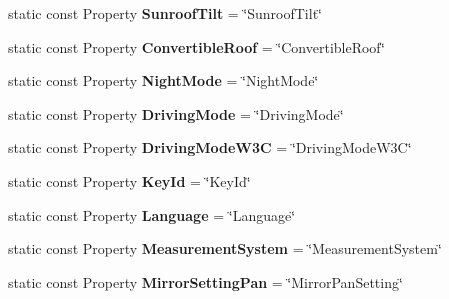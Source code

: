\begin{DoxyCompactItemize}
\item 
\hypertarget{classVehicleProperty_aaa5b7fe1aa9c1df58285370a2223a9a7}{static const Property {\bfseries Sunroof\-Tilt} = \char`\"{}Sunroof\-Tilt\char`\"{}}\label{classVehicleProperty_aaa5b7fe1aa9c1df58285370a2223a9a7}

\item 
\hypertarget{classVehicleProperty_ac81ed60b4ae5140288191380470aa6fe}{static const Property {\bfseries Convertible\-Roof} = \char`\"{}Convertible\-Roof\char`\"{}}\label{classVehicleProperty_ac81ed60b4ae5140288191380470aa6fe}

\item 
\hypertarget{classVehicleProperty_af85dc0e35b81d1ce30818c0dc2cbde94}{static const Property {\bfseries Night\-Mode} = \char`\"{}Night\-Mode\char`\"{}}\label{classVehicleProperty_af85dc0e35b81d1ce30818c0dc2cbde94}

\item 
\hypertarget{classVehicleProperty_a4b68af6a7539a07a2be7438bd6ced9f0}{static const Property {\bfseries Driving\-Mode} = \char`\"{}Driving\-Mode\char`\"{}}\label{classVehicleProperty_a4b68af6a7539a07a2be7438bd6ced9f0}

\item 
\hypertarget{classVehicleProperty_a54cf61b61a0d1929e729454c834d3cf2}{static const Property {\bfseries Driving\-Mode\-W3\-C} = \char`\"{}Driving\-Mode\-W3\-C\char`\"{}}\label{classVehicleProperty_a54cf61b61a0d1929e729454c834d3cf2}

\item 
\hypertarget{classVehicleProperty_ab4e37b9cd6be99aa50f009cf8b26f8ae}{static const Property {\bfseries Key\-Id} = \char`\"{}Key\-Id\char`\"{}}\label{classVehicleProperty_ab4e37b9cd6be99aa50f009cf8b26f8ae}

\item 
\hypertarget{classVehicleProperty_a715e47aac9daf8a45e34f8379f722c36}{static const Property {\bfseries Language} = \char`\"{}Language\char`\"{}}\label{classVehicleProperty_a715e47aac9daf8a45e34f8379f722c36}

\item 
\hypertarget{classVehicleProperty_a4f252ed33c21bfe8ffab942c765ccd40}{static const Property {\bfseries Measurement\-System} = \char`\"{}Measurement\-System\char`\"{}}\label{classVehicleProperty_a4f252ed33c21bfe8ffab942c765ccd40}

\item 
\hypertarget{classVehicleProperty_ace555610ee0cd0737f2d9b439523666a}{static const Property {\bfseries Mirror\-Setting\-Pan} = \char`\"{}Mirror\-Pan\-Setting\char`\"{}}\label{classVehicleProperty_ace555610ee0cd0737f2d9b439523666a}


\end{DoxyCompactItemize}
